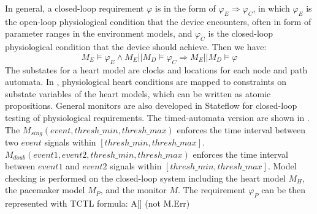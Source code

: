 In general, a closed-loop requirement $\varphi$ is in the form of $\varphi_E\Rightarrow \varphi_C$, in which $\varphi_E$ is the open-loop physiological condition that the device encounters, often in form of parameter ranges in the environment models, and $\varphi_C$ is the closed-loop physiological condition that the device should achieve. Then we have:
\begin{equation}\label{req_def}
M_E\models\varphi_E \land M_E||M_D\models \varphi_C\Rightarrow M_E||M_D\models\varphi
\end{equation}
The substates for a heart model are clocks and locations for each node and path automata. In \cite{vhm_iccps11}, physiological heart conditions are mapped to constraints on substate variables of the heart models, which can be written as atomic propositions. General monitors are also developed in Stateflow \cite{stateflow} for closed-loop testing of physiological requirements. The timed-automata version are shown in . The $M_{sing}(event,thresh\_min, thresh\_max)$ enforces the time interval between two $event$ signals within $[thresh\_min,thresh\_max]$. \\
$M_{doub}(event1,event2,thresh\_min,thresh\_max)$ enforces the time interval between $event1$ and $event2$ signals within $[thresh\_min,thresh\_max]$. Model checking is performed on the closed-loop system including the heart model $M_H$, the pacemaker model $M_P$, and the monitor $M$. The requirement $\varphi_P$ can be then represented with TCTL formula:
 \textsf{A[] (not M.Err)}

%